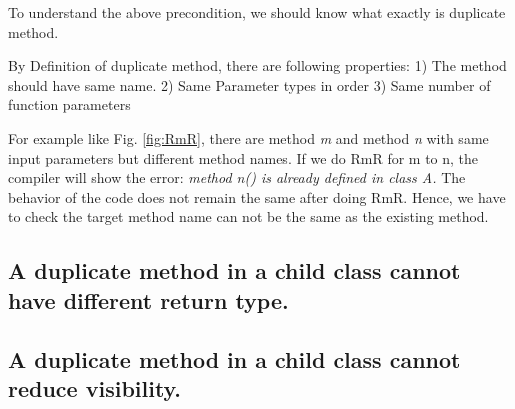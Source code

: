 To understand the above precondition, we should know what exactly is duplicate method.

By Definition of duplicate method, there are following properties:
1) The method should have same name.
2) Same Parameter types in order
3) Same number of function parameters

For example like Fig. \ref{fig:RmR}, there are method \textsl{m} and method \textsl{n} with same input parameters but different method names. If we do RmR for m to n, the compiler will show the error: \textsl{method n() is already defined in class A.} The behavior of the code does not remain the same after doing RmR. Hence, we have to check the target method name can not be the same as the existing method.

\subsection{A duplicate method in a child class cannot have different return type.}


\subsection{A duplicate method in a child class cannot reduce visibility.}

